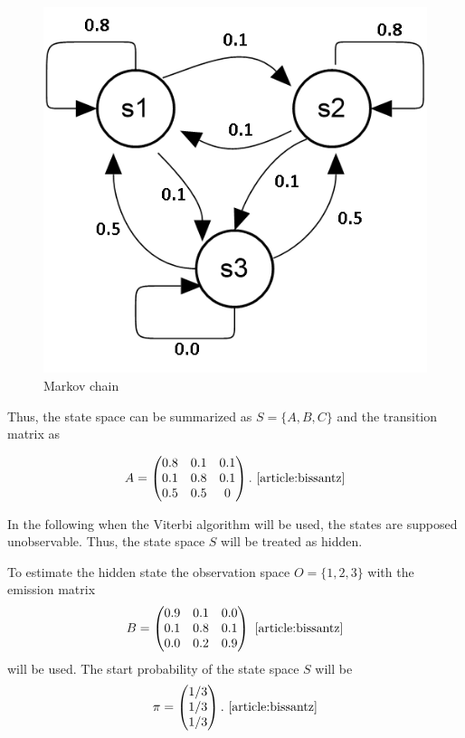 \documentclass[12pt,journal,compsoc]{IEEEtran}
\begin{document}
\begin{figure}[ht]
	\centering	
  	\includegraphics[scale=0.65]{figures/fig2_HiddenStates.png}
	\caption{Markov chain \cite{article:bissantz}}
	\label{fig2}
\end{figure}
Thus, the state space can be summarized as $S=\{A, B, C\}$ and the transition matrix as 

\[
  A=\begin{pmatrix}
 0.8 & 0.1 & 0.1 \\
 0.1 & 0.8 & 0.1 \\
 0.5 & 0.5 & 0 
  \end{pmatrix}
. \text{ \cite{article:bissantz}}\]

In the following when the Viterbi algorithm will be used, the states are supposed unobservable. Thus, the state space $S$ will be treated as hidden. 

To estimate the hidden state the observation space $O=\{1, 2, 3\}$ with the emission matrix 
\[
  B=\begin{pmatrix}
 0.9 & 0.1 & 0.0 \\
 0.1 & 0.8 & 0.1 \\
 0.0 & 0.2 & 0.9 
  \end{pmatrix}
\text{ \cite{article:bissantz}}\]
will be used. The start probability of the state space $S$ will be 
\[
  \pi=\begin{pmatrix}
 1/3  \\
  1/3 \\
  1/3
  \end{pmatrix}.
\text{ \cite{article:bissantz}}\]
\end{document}

